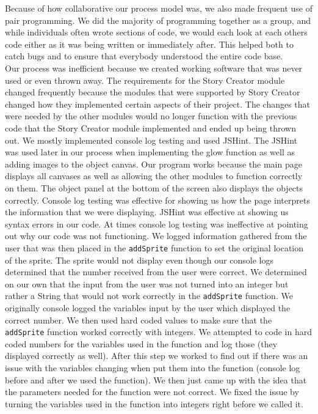 \documentclass[12pt]{article}
\begin{document}
Because of how collaborative our process model was, we also made frequent use of pair programming. We did the majority of programming together as a group, and while individuals often wrote sections of code, we would each look at each others code either as it was being written or immediately after. This helped both to catch bugs and to ensure that everybody understood the entire code base. \\

Our process was inefficient because we created working software that was never used or even thrown away.  The requirements for the Story Creator module changed frequently because the modules that were supported by Story Creator changed how they implemented certain aspects of their project.  The changes that were needed by the other modules would no longer function with the previous code that the Story Creator module implemented and ended up being thrown out.  We mostly implemented console log testing and used JSHint.  The JSHint was used later in our process when implementing the glow function as well as adding images to the object canvas.  Our program works because the main page displays all canvases as well as allowing the other modules to function correctly on them.  The object panel at the bottom of the screen also displays the objects correctly.  Console log testing was effective for showing us how the page interprets the information that we were displaying.  JSHint was effective at showing us syntax errors in our code.  At times console log testing was ineffective at pointing out why our code was not functioning.  We logged information gathered from the user that was then placed in the \texttt{addSprite} function to set the original location of the sprite.  The sprite would not display even though our console logs determined that the number received from the user were correct.  We determined on our own that the input from the user was not turned into an integer but rather a String that would not work correctly in the \texttt{addSprite} function.  We originally console logged the variables input by the user which displayed the correct number.  We then used hard coded values to make sure that the \texttt{addSprite} function worked correctly with integers.  We attempted to code in hard coded numbers for the variables used in the function and log those (they displayed correctly as well).  After this step we worked to find out if there was an issue with the variables changing when put them into the function (console log before and after we used the function).  We then just came up with the idea that the parameters needed for the function were not correct.  We fixed the issue by turning the variables used in the function into integers right before we called it.  \\
\end{document}
